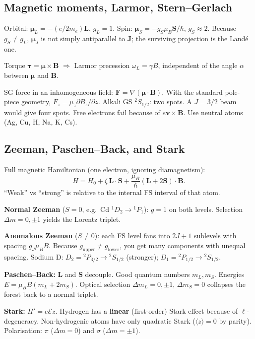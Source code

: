 \documentclass[11pt,a4paper]{article}
\begin{document}
\subsection{Magnetic moments, Larmor, Stern--Gerlach}
Orbital: \(\boldsymbol{\mu}_L=-(e/2m_e)\mathbf{L}\), \(g_L=1\).
Spin: \(\boldsymbol{\mu}_S=-g_S\mu_B\mathbf{S}/\hbar\), \(g_S\approx 2\).
Because \(g_S\neq g_L\), \(\boldsymbol{\mu}_J\) is not simply antiparallel to \(\mathbf{J}\); the surviving projection is the Land\'e one.

Torque \(\boldsymbol{\tau}=\boldsymbol{\mu}\times\mathbf{B}\) \(\Rightarrow\) Larmor precession \(\omega_L=\gamma B\), independent of the angle \(\alpha\) between \(\boldsymbol{\mu}\) and \(\mathbf{B}\).

SG force in an inhomogeneous field: \(\mathbf{F}=\nabla(\boldsymbol{\mu}\cdot\mathbf{B})\). With the standard pole-piece geometry, \(F_z=\mu_z\partial B_z/\partial z\). Alkali GS \({}^2S_{1/2}\): two spots. A \(J=3/2\) beam would give four spots. Free electrons fail because of \(e\mathbf{v}\times\mathbf{B}\). Use neutral atoms (Ag, Cu, H, Na, K, Cs).

\subsection{Zeeman, Paschen--Back, and Stark}
Full magnetic Hamiltonian (one electron, ignoring diamagnetism):
\[
H=H_0+\zeta\,\mathbf{L}\cdot\mathbf{S}+\frac{\mu_B}{\hbar}(\mathbf{L}+2\mathbf{S})\cdot\mathbf{B}.
\]
``Weak'' vs ``strong'' is relative to the internal FS interval of that atom.

\textbf{Normal Zeeman} (\(S=0\), e.g.\ Cd \({}^1D_2\to{}^1P_1\)): \(g=1\) on both levels. Selection \(\Delta m=0,\pm 1\) yields the Lorentz triplet.

\textbf{Anomalous Zeeman} (\(S\neq 0\)): each FS level fans into \(2J+1\) sublevels with spacing \(g_J\mu_B B\). Because \(g_{\mathrm{upper}}\neq g_{\mathrm{lower}}\), you get many components with unequal spacing. Sodium D: \(D_2={}^2P_{3/2}\to{}^2S_{1/2}\) (stronger); \(D_1={}^2P_{1/2}\to{}^2S_{1/2}\).

\textbf{Paschen--Back:} \(\mathbf{L}\) and \(\mathbf{S}\) decouple. Good quantum numbers \(m_L,m_S\). Energies \(E=\mu_B B(m_L+2m_S)\). Optical selection \(\Delta m_L=0,\pm 1\), \(\Delta m_S=0\) collapses the forest back to a normal triplet.

\textbf{Stark:} \(H'=e\mathcal{E}z\). Hydrogen has a \textbf{linear} (first-order) Stark effect because of \(\ell\)-degeneracy. Non-hydrogenic atoms have only quadratic Stark (\(\langle z\rangle=0\) by parity). Polarisation: \(\pi\) (\(\Delta m=0\)) and \(\sigma\) (\(\Delta m=\pm 1\)).
\end{document}
